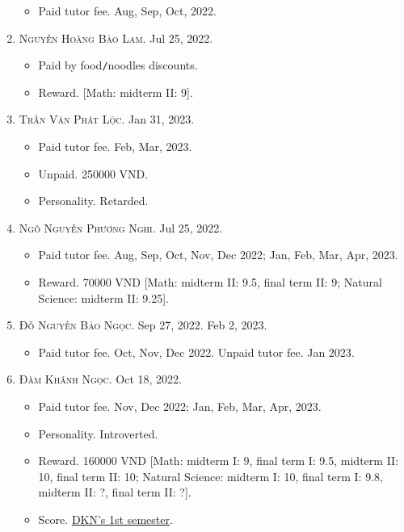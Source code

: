 \documentclass{article}
\begin{document}
\begin{enumerate}
	\begin{itemize}
		\item {\sf Paid tutor fee.} Aug, Sep, Oct, 2022.
	\end{itemize}
	\item \textsc{Nguyễn Hoàng Bảo Lam.} {\sf[In]} Jul 25, 2022.
	\begin{itemize}
		\item {\sf Paid by food\texttt{/}noodles discounts.}
		\item {\sf Reward.} [Math: midterm II: 9].
	\end{itemize}
	\item \textsc{Trần Văn Phát Lộc.} {\sf[In]} Jan 31, 2023.  {\sf[Out]}
	\begin{itemize}
		\item {\sf Paid tutor fee.} Feb, Mar, 2023.
		\item {\sf Unpaid.} 250000 VND.
		\item {\sf Personality.} Retarded.
	\end{itemize}
	\item \textsc{Ngô Nguyễn Phương Nghi.} {\sf[In]} Jul 25, 2022.
	\begin{itemize}
		\item {\sf Paid tutor fee.} Aug, Sep, Oct, Nov, Dec 2022; Jan, Feb, Mar, Apr, 2023.
		\item {\sf Reward.} 70000 VND [Math: midterm II: 9.5, final term II: 9; Natural Science: midterm II: 9.25].
	\end{itemize}
	\item \textsc{Đỗ Nguyễn Bảo Ngọc.} {\sf[In]} Sep 27, 2022. {\sf[Out]} Feb 2, 2023.
	\begin{itemize}
		\item {\sf Paid tutor fee.} Oct, Nov, Dec 2022. {\sf Unpaid tutor fee.} Jan 2023.
	\end{itemize}
	\item \textsc{Đàm Khánh Ngọc.} {\sf[In]} Oct 18, 2022.
	\begin{itemize}
		\item {\sf Paid tutor fee.} Nov, Dec 2022; Jan, Feb, Mar, Apr, 2023.
		\item {\sf Personality.} Introverted.
		\item {\sf Reward.} 160000 VND [Math: midterm I: 9, final term I: 9.5, midterm II: 10, final term II: 10; Natural Science: midterm I: 10, final term I: 9.8, midterm II: ?, final term II: ?].
		\item {\sf Score.} \href{https://github.com/NQBH/hobby/blob/master/STEM/student/Dam_Khanh_Ngoc_grade_6_1st_semester.jpg}{DKN's 1st semester}.

\end{itemize}
\end{enumerate}
\end{document}
